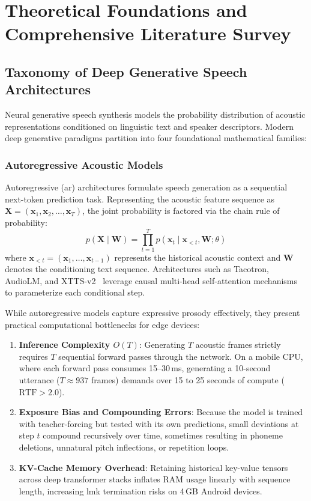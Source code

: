\chapter{Theoretical Foundations and Comprehensive Literature Survey}
\label{Chapter2}

\section{Taxonomy of Deep Generative Speech Architectures}
Neural generative speech synthesis models the probability distribution of acoustic representations conditioned on linguistic text and speaker descriptors. Modern deep generative paradigms partition into four foundational mathematical families:

\subsection{Autoregressive Acoustic Models}
Autoregressive (\acrshort{ar}) architectures formulate speech generation as a sequential next-token prediction task. Representing the acoustic feature sequence as $\mathbf{X} = (\mathbf{x}_1, \mathbf{x}_2, \dots, \mathbf{x}_T)$, the joint probability is factored via the chain rule of probability:
\begin{equation}
    p(\mathbf{X} \mid \mathbf{W}) = \prod_{t=1}^T p(\mathbf{x}_t \mid \mathbf{x}_{<t}, \mathbf{W}; \theta)
    \label{eq:ar_factorization}
\end{equation}
where $\mathbf{x}_{<t} = (\mathbf{x}_1, \dots, \mathbf{x}_{t-1})$ represents the historical acoustic context and $\mathbf{W}$ denotes the conditioning text sequence. Architectures such as Tacotron, AudioLM, and XTTS-v2~\cite{casanova2024xtts} leverage causal multi-head self-attention mechanisms~\cite{vaswani2017attention} to parameterize each conditional step. 

While autoregressive models capture expressive prosody effectively, they present practical computational bottlenecks for edge devices:
\begin{enumerate}[label=(\alph*)]
    \item \textbf{Inference Complexity $O(T)$}: Generating $T$ acoustic frames strictly requires $T$ sequential forward passes through the network. On a mobile CPU, where each forward pass consumes 15--30\,ms, generating a 10-second utterance ($T \approx 937$ frames) demands over 15 to 25 seconds of compute ($\text{RTF} > 2.0$).
    \item \textbf{Exposure Bias and Compounding Errors}: Because the model is trained with teacher-forcing but tested with its own predictions, small deviations at step $t$ compound recursively over time, sometimes resulting in phoneme deletions, unnatural pitch inflections, or repetition loops.
    \item \textbf{KV-Cache Memory Overhead}: Retaining historical key-value tensors across deep transformer stacks inflates RAM usage linearly with sequence length, increasing \gls{lmk} termination risks on 4\,GB Android devices.
\end{enumerate}

